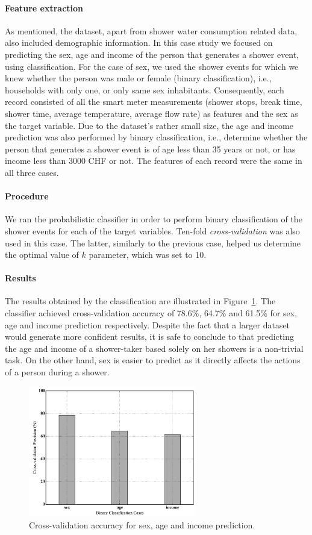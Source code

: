 \paragraph{Feature extraction}
\label{par:feat_extr2}
As mentioned, the dataset, apart from shower water consumption related data, also included demographic information. In this case study we focused on predicting the sex, age and income of the person that generates a shower event, using classification. For the case of sex, we used the shower events for which we knew whether the person was male or female (binary classification), i.e., households with only one, or only same sex inhabitants. Consequently, each record consisted of all the smart meter measurements (shower stops, break time, shower time, average temperature, average flow rate) as features and the sex as the target variable. Due to the dataset's rather small size, the age and income prediction was also performed by binary classification, i.e., determine whether the person that generates a shower event is of age less than 35 years or not, or has income less than 3000 CHF or not. The features of each record were the same in all three cases.

\paragraph{Procedure}
\label{par:procedure2}
We ran the probabilistic classifier in order to perform binary classification of the shower events for each of the target variables. Ten-fold \textit{cross-validation} was also used in this case. The latter, similarly to the previous case, helped us determine the optimal value of $k$ parameter, which was set to 10.

\paragraph{Results}
\label{par:res2}
The results obtained by the classification are illustrated in Figure~\ref{figure10}. The classifier achieved cross-validation accuracy of 78.6\%, 64.7\% and 61.5\% for sex, age and income prediction respectively. Despite the fact that a larger dataset would generate more confident results, it is safe to conclude to that predicting the age and income of a shower-taker based solely on her showers is a non-trivial task. On the other hand, sex is easier to predict as it directly affects the actions of a person during a shower.

 \begin{figure}[!tb]
 	\centering
 	\includegraphics[width=0.65\textwidth]{figures/figure10.pdf}
 	\caption{Cross-validation accuracy for sex, age and income prediction.}	
 	\label{figure10}
 \end{figure}